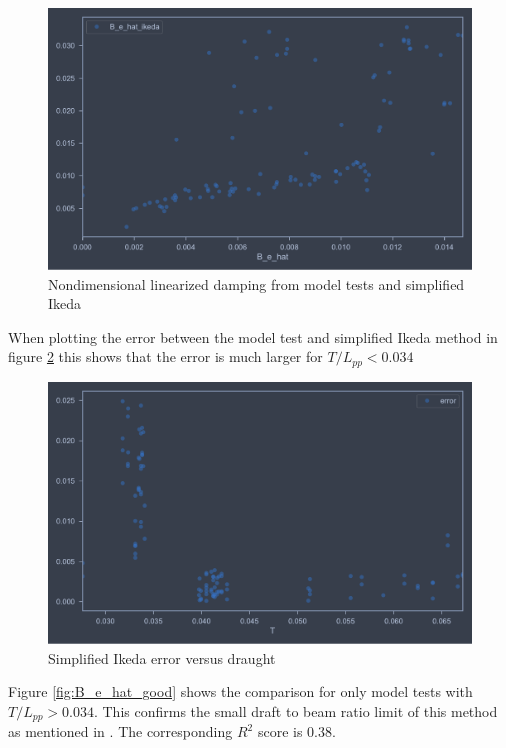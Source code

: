 \begin{figure}[H]
    \centering
    \includegraphics[width=\columnwidth]{figures/B_e_hat_ikeda.pdf}
    \caption{Nondimensional linearized damping from model tests and simplified Ikeda}
    \label{fig:B_e_hat_ikeda}
\end{figure}

When plotting the error between the model test and simplified Ikeda method in figure \ref{fig:B_e_hat_error} this shows that the error is much larger for $T/L_{pp}<0.034$

\begin{figure}[H]
    \centering
    \includegraphics[width=\columnwidth]{figures/B_e_hat_error.pdf}
    \caption{Simplified Ikeda error versus draught}
    \label{fig:B_e_hat_error}
\end{figure}

Figure \ref{fig:B_e_hat_good} shows the comparison for only model tests with $T/L_{pp}>0.034$.
This confirms the small draft to beam ratio limit of this method as mentioned in \cite{kawahara_simple_2011}. The corresponding $R^2$ score is 0.38.

